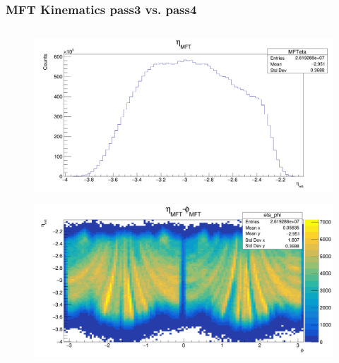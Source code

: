 \documentclass[11pt]{beamer}
\begin{document}
\begin{frame}
    \frametitle{MFT Kinematics pass3 vs. pass4}

    \begin{columns}[c]
        \begin{column}{0.5\textwidth}
            \begin{figure}
                \begin{center}
                    \includegraphics[width=\textwidth]{Plots/MFT_pass3/eta.png}
                \end{center}
            \end{figure}
            \begin{figure}
                \begin{center}
                    \includegraphics[width=\textwidth]{Plots/MFT_pass3/eta-phi.png}
                \end{center}
            \end{figure}
        \end{column}


\end{columns}
\end{frame}
\end{document}
